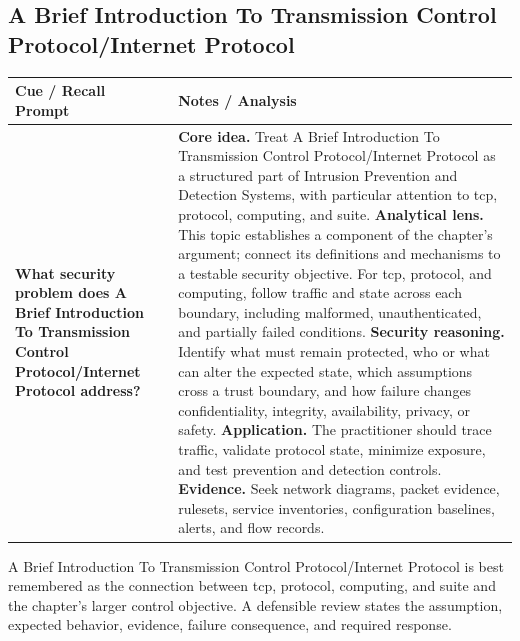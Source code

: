 \documentclass[11pt]{article}
\newcommand{\CornellHeader}{%
\rowcolor{Navy}\color{white}\bfseries Cue / Recall Prompt & \color{white}\bfseries Notes / Analysis\\\hline}
\newcommand{\CornellRow}[2]{%
\cellcolor{CueGray}\RaggedRight\textbf{#1} & \RaggedRight #2\\\hline}
\begin{document}
\subsection*{A Brief Introduction To Transmission Control Protocol/Internet Protocol}
\begin{longtable}{>{\RaggedRight\arraybackslash}p{}|>{\RaggedRight\arraybackslash}p{}}
\CornellHeader
\CornellRow{What security problem does A Brief Introduction To Transmission Control Protocol/Internet Protocol address?}{\textbf{Core idea.} Treat A Brief Introduction To Transmission Control Protocol/Internet Protocol as a structured part of Intrusion Prevention and Detection Systems, with particular attention to tcp, protocol, computing, and suite. \textbf{Analytical lens.} This topic establishes a component of the chapter's argument; connect its definitions and mechanisms to a testable security objective. For tcp, protocol, and computing, follow traffic and state across each boundary, including malformed, unauthenticated, and partially failed conditions. \textbf{Security reasoning.} Identify what must remain protected, who or what can alter the expected state, which assumptions cross a trust boundary, and how failure changes confidentiality, integrity, availability, privacy, or safety. \textbf{Application.} The practitioner should trace traffic, validate protocol state, minimize exposure, and test prevention and detection controls. \textbf{Evidence.} Seek network diagrams, packet evidence, rulesets, service inventories, configuration baselines, alerts, and flow records.}
\end{longtable}
\begin{topicsummary}
A Brief Introduction To Transmission Control Protocol/Internet Protocol is best remembered as the connection between tcp, protocol, computing, and suite and the chapter's larger control objective. A defensible review states the assumption, expected behavior, evidence, failure consequence, and required response.
\end{topicsummary}
\end{document}
